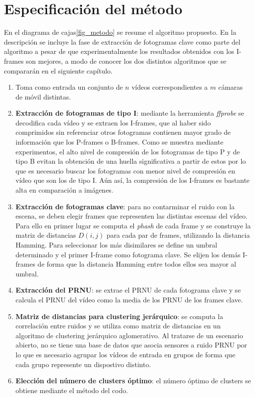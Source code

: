 \section{Especificación del método}
En el diagrama de cajas\ref{fig_metodo} se resume el algoritmo propuesto. En la descripción se incluye la fase de extracción de fotogramas clave como parte del algoritmo a pesar de que experimentalmente los resultados obtenidos con los I-frames son mejores, a modo de conocer los dos distintos algoritmos que se compararán en el siguiente capítulo. \\
\begin{enumerate}
\item Toma como entrada un conjunto de $n$ vídeos correspondientes a $m$ cámaras de móvil distintas.
\item \textbf{Extracción de fotogramas de tipo I}: mediante la herramienta \textit{ffprobe} se decodifica cada vídeo y se extraen los I-frames, que al haber sido comprimidos sin referenciar otros fotogramas contienen mayor grado de información que los P-frames o B-frames. Como se muestra mediante experimentos, el alto nivel de compresión de los fotogramas de tipo P y de tipo B evitan la obtención de una huella significativa a partir de estos por lo que es necesario buscar los fotogramas con menor nivel de compresión en vídeo que son los de tipo I. Aún así, la compresión de los I-frames es bastante alta en comparación a imágenes.
\item \textbf{Extracción de fotogramas clave}: para no contarminar el ruido con la escena, se deben elegir frames que representen las distintas escenas del vídeo. Para ello en primer lugar se computa el \textit{phash} de cada frame y se construye la matriz de distancias $D(i,j)$ para cada par de frames, utilizando la distancia Hamming. Para seleccionar los más disimilares se define un umbral determinado y el primer I-frame como fotograma clave. Se elijen los demás I-frames de forma que la distancia Hamming entre todos ellos sea mayor al umbral.
\item \textbf{Extracción del PRNU}: se extrae el PRNU de cada fotograma clave y se calcula el PRNU del vídeo como la media de los PRNU de los frames clave. 
\item \textbf{Matriz de distancias para clustering jerárquico}: se computa la correlación entre ruidos y se utiliza como matriz de distancias en un algoritmo de clustering jerárquico aglomerativo. Al tratarse de un escenario abierto, no se tiene una base de datos que asocia sensores a ruido PRNU por lo que es necesario agrupar los vídeos de entrada en grupos de forma que cada grupo represente un dispostivo distinto. 
\item \textbf{Elección del número de clusters óptimo}: el número óptimo de clusters se obtiene mediante el método del codo.
\end{enumerate}

